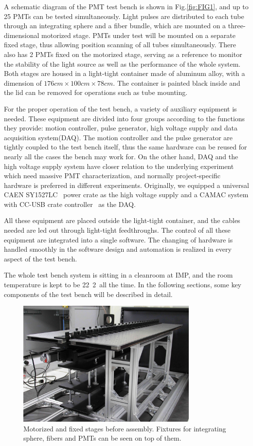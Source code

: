 \documentclass[review, times]{elsarticle}
\begin{document}
A schematic diagram of the PMT test bench is shown in Fig.\ref{fig:FIG1}, and up to 25 PMTs can be tested simultaneously.
Light pulses are distributed to each tube through an integrating sphere and a fiber bundle, which are mounted on a three-dimensional motorized stage.
PMTs under test will be mounted on a separate fixed stage, thus allowing position scanning of all tubes simultaneously.
There also has 2 PMTs fixed on the motorized stage, serving as a reference to monitor the stability of the light source as well as the performance of the whole system.
Both stages are housed in a light-tight container made of aluminum alloy, with a dimension of $176cm\times100cm\times78cm$.
The container is painted black inside and the lid can be removed for operations such as tube mounting.

For the proper operation of the test bench, a variety of auxiliary equipment is needed. 
These equipment are divided into four groups according to the functions they provide: motion controller, pulse generator, high voltage supply and data acquisition system(DAQ).
The motion controller and the pulse generator are tightly coupled to the test bench itself, thus the same hardware can be reused for nearly all the cases the bench may work for.
On the other hand, DAQ and the high voltage supply system have closer relation to the underlying experiment which need massive PMT characterization, and normally project-specific hardware is preferred in different experiments. 
Originally, we equipped a universal CAEN SY1527LC~\cite{sy1527lc} power crate as the high voltage supply and a CAMAC system with CC-USB crate controller~\cite{cc_usb} as the DAQ.

All these equipment are placed outside the light-tight container, and the cables needed are led out through light-tight feedthroughs.
The control of all these equipment are integrated into a single software. The changing of hardware is handled smoothly in the software design and automation is realized in every aspect of the test bench.

The whole test bench system is sitting in a cleanroom at IMP, and the room temperature is kept to be 22\textpm~2\textcelsius~all the time. 
In the following sections, some key components of the test bench will be described in detail.

\begin{figure}
 \centering
 \includegraphics[width=90mm]{FIG2}
\caption{Motorized and fixed stages before assembly.
Fixtures for integrating sphere, fibers and PMTs can be seen on top of them.}
\label{fig:FIG2}
\end{figure} 
\end{document}

